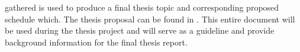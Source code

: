 gathered is used to produce a final thesis topic and corresponding proposed schedule which. The thesis proposal can be found in . This entire document will be used during the thesis project and will serve as a guideline and provide background information for the final thesis report.


